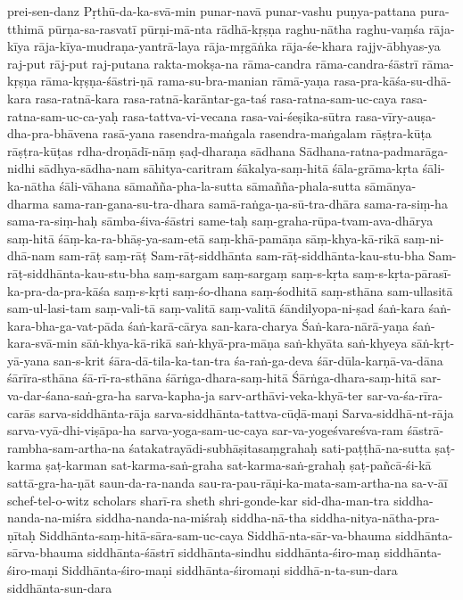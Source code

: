 {prei-sen-danz
Pṛthū-da-ka-svā-min
punar-navā
punar-vashu
puṇya-pattana
pura-tthimā
    pūrṇa-sa-rasvatī
pūrṇi-mā-nta
rādhā-kṛṣṇa
raghu-nātha
raghu-vaṃśa
rāja-kīya
rāja-kīya-mudraṇa-yantrā-laya
rāja-mṛgāṅka
rāja-śe-khara
rajjv-ābhyas-ya
raj-put
rāj-put
raj-putana
rakta-mokṣa-na
rāma-candra
rāma-candra-śāstrī
rāma-kṛṣṇa
rāma-kṛṣṇa-śāstri-ṇā
rama-su-bra-manian
rāmā-yaṇa
rasa-pra-kāśa-su-dhā-kara
rasa-ratnā-kara
rasa-ratnā-karāntar-ga-taś
rasa-ratna-sam-uc-caya
rasa-ratna-sam-uc-ca-yaḥ
rasa-tattva-vi-vecana
    rasa-vai-śeṣika-sūtra
rasa-vīry-auṣa-dha-pra-bhāvena
rasā-yana
rasendra-maṅgala
rasendra-maṅgalam
rāṣṭra-kūṭa
rāṣṭra-kūṭas
    rdha-droṇādī-nāṃ
ṣaḍ-dharaṇa
sādhana
Sādhana-ratna-padmarāga-nidhi
    sādhya-sādha-nam
sāhitya-caritram 
śākalya-saṃ-hitā
śāla-grāma-kṛta
    śāli-ka-nātha
śāli-vāhana
sāmañña-pha-la-sutta
sāmañña-phala-sutta
sāmānya-dharma
sama-ran-gana-su-tra-dhara
samā-raṅga-ṇa-sū-tra-dhāra
sama-ra-siṃ-ha
sama-ra-siṃ-haḥ
sāmba-śiva-śāstri
same-taḥ
saṃ-graha-rūpa-tvam-ava-dhārya
saṃ-hitā
śāṃ-ka-ra-bhāṣ-ya-sam-etā
saṃ-khā-pamāṇa
    sāṃ-khya-kā-rikā
    saṃ-ni-dhā-nam
sam-rāṭ
saṃ-rāṭ
Sam-rāṭ-siddhānta
sam-rāṭ-siddhānta-kau-stu-bha
Sam-rāṭ-siddhānta-kau-stu-bha
saṃ-sargam
saṃ-sargaṃ
saṃ-s-kṛta
saṃ-s-kṛta-pārasī-ka-pra-da-pra-kāśa
saṃ-s-kṛti 
saṃ-śo-dhana
saṃ-śodhitā
saṃ-sthāna
sam-ullasitā
sam-ul-lasi-tam
    saṃ-vali-tā
    saṃ-valitā
saṃ-valitā
śāndilyopa-ni-ṣad
śaṅ-kara
śaṅ-kara-bha-ga-vat-pāda
śaṅ-karā-cārya
san-kara-charya
Śaṅ-kara-nārā-yaṇa
    śaṅ-kara-svā-min
    sāṅ-khya-kā-rikā
saṅ-khyā-pra-māṇa
saṅ-khyāta
saṅ-khyeya
sāṅ-kṛt-yā-yana
san-s-krit
śāra-dā-tila-ka-tan-tra
śa-raṅ-ga-deva
śār-dūla-karṇā-va-dāna
    śārīra-sthāna
śā-rī-ra-sthāna
śārṅga-dhara-saṃ-hitā
Śārṅga-dhara-saṃ-hitā
sar-va-dar-śana-saṅ-gra-ha
sarva-kapha-ja
sarv-arthāvi-veka-khyā-ter
sar-va-śa-rīra-carās
sarva-siddhānta-rāja
sarva-siddhānta-tattva-cūḍā-maṇi
Sarva-siddhā-nt-rāja
sarva-vyā-dhi-viṣāpa-ha
sarva-yoga-sam-uc-caya
sar-va-yogeśvareśva-ram
śāstrā-rambha-sam-artha-na
śatakatrayādi-subhāṣitasaṃgrahaḥ
sati-paṭṭhā-na-sutta
ṣaṭ-karma
ṣaṭ-karman
sat-karma-saṅ-graha
sat-karma-saṅ-grahaḥ
ṣaṭ-pañcā-śi-kā
    sattā-gra-ha-ṇāt
saun-da-ra-nanda
sau-ra-pau-rāṇi-ka-mata-sam-artha-na
sa-v-āī
schef-tel-o-witz
scholars
sharī-ra
sheth
shri-gonde-kar
sid-dha-man-tra
siddha-nanda-na-miśra
siddha-nanda-na-miśraḥ
siddha-nā-tha
siddha-nitya-nātha-pra-ṇītaḥ
Siddhānta-saṃ-hitā-sāra-sam-uc-caya
Siddhā-nta-sār-va-bhauma
siddhānta-sārva-bhauma
siddhānta-śāstrī
siddhānta-sindhu
siddhānta-śiro-maṇ
siddhānta-śiro-maṇi
Siddhānta-śiro-maṇi
siddhānta-śiromaṇi
siddhā-n-ta-sun-dara
siddhānta-sun-dara
}
